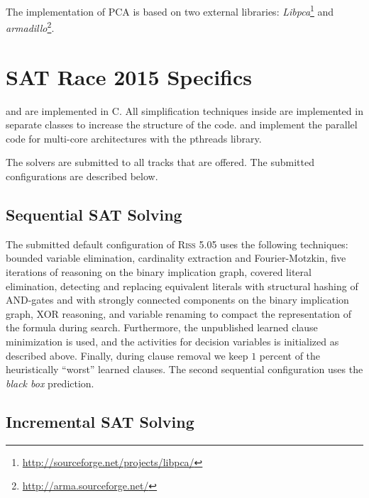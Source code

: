 \documentclass[conference]{IEEEtran}
\def\CC{{C\nolinebreak[4]\hspace{-.05em}\raisebox{.4ex}{\tiny\bf ++}}}
\begin{document}
The implementation of PCA is based on two external libraries: \emph{Libpca}\footnote{\url{http://sourceforge.net/projects/libpca/}} and \emph{armadillo}\footnote{\url{http://arma.sourceforge.net/}}.

%  

\section{SAT Race 2015 Specifics}

\riss and \coprocessor are implemented in \CC. 
All simplification techniques inside \coprocessor are implemented in separate classes to increase the structure of the code. 
\priss and \pcasso implement the parallel code for multi-core architectures with the pthreads library.

The solvers are submitted to all tracks that are offered. 
The submitted configurations are described below. 

\subsection{Sequential SAT Solving}

The submitted default configuration of \textsc{Riss 5.05} uses the following techniques:
%
bounded variable elimination, 
cardinality extraction and Fourier-Motzkin, 
five iterations of reasoning on the binary implication graph,
covered literal elimination,
detecting and replacing equivalent literals with structural hashing of AND-gates and with strongly connected components on the binary implication graph,
XOR reasoning, 
and variable renaming to compact the representation of the formula during search. 
Furthermore, the unpublished learned clause minimization is used, and the activities for decision variables is initialized as described above. 
Finally, during clause removal we keep $1$ percent of the heuristically ``worst'' learned clauses. 
The second sequential configuration uses the \emph{black box} prediction. 

\subsection{Incremental SAT Solving} \label{ss:incsolving}
\end{document}
